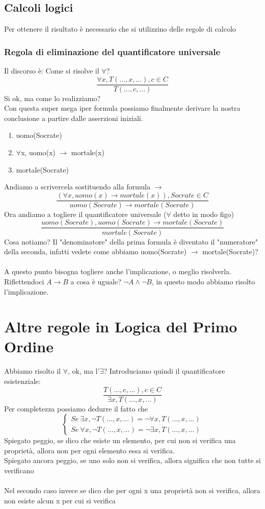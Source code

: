 \documentclass[12pt, a4paper, openany, oneside]{book}
\begin{document}
\subsection{Calcoli logici}
Per ottenere il risultato è necessario che si utilizzino delle regole di
calcolo %
\subsubsection{Regola di eliminazione del quantificatore universale}
Il discorso è: Come si risolve il $\forall$?
\[\frac{\forall x, T(..., x, ...), c\in C}{T(..., c, ...)} \]
Si ok, ma come lo realizziamo?  \\ 
Con questa super mega iper formula possiamo finalmente derivare la nostra
conclusione a partire dalle asserzioni iniziali. 
\begin{enumerate}
	\item uomo(Socrate)
	\item $\forall$x, uomo(x) $\to$ mortale(x)
	\item mortale(Socrate)
\end{enumerate}
Andiamo a scrivercela sostituendo alla formula $\to$
\[\frac{(\forall x, uomo(x) \to mortale(x)), Socrate\in C}{uomo(Socrate)\to 
mortale(Socrate)}\]
Ora andiamo a togliere il quantificatore universale ($\forall$ detto in modo figo)
\[ \frac{uomo(Socrate), uomo(Socrate) \to mortale(Socrate)}{mortale(Socrate)}\]
Cosa notiamo? Il "denominatore" della prima formula è diventato il "numeratore"
della seconda, infatti vedete come abbiamo uomo(Socrate) $\to$ mortale(Socrate)?
\\ \\
A questo punto bisogna togliere anche l'implicazione, o meglio risolverla. 
Riflettendoci $A \to B$ a cosa è uguale? $\neg A \wedge \neg B$, in questo
modo abbiamo risolto l'implicazione.
\section{Altre regole in Logica del Primo Ordine}
Abbiamo risolto il $\forall$, ok, ma l'$\exists$?
Introduciamo quindi il quantificatore esistenziale:
\[
\frac{T(..., c, ...), c\in C}{\exists x, T(..., x, ...)} 
\]
Per completezza possiamo dedurre il fatto che 
\[
\begin{cases}
Se ~ \exists x, \neg T(..., x, ...) = \neg \forall x, T(..., x, ...) \\
Se ~ \forall x, \neg T(..., x, ...) = \neg \exists x, T(..., x, ...)
\end{cases} 
\]
Spiegato peggio, se dico che esiste un elemento, per cui non si verifica una 
proprietà, allora non per ogni elemento essa si verifica. \\ 
Spiegato ancora peggio, se uno solo non si verifica, allora significa che non 
tutte si verificano \\ \\
Nel secondo caso invece se dico che per ogni x una proprietà non si verifica,
allora non esiste alcun x per cui si verifica 
\end{document}
